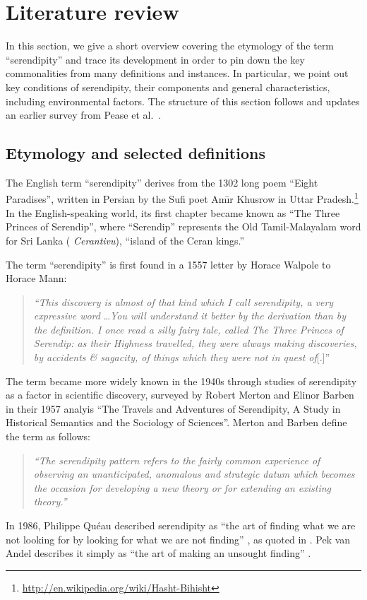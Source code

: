 \documentclass{llncs}
\begin{document}
\section{Literature review} \label{sec:literature-review}

In this section, we give a short overview covering the etymology of
the term ``serendipity'' and trace its development in order to pin
down the key commonalities from many definitions and instances.  In
particular, we point out key conditions of serendipity, their
components and general characteristics, including environmental
factors.  The structure of this section follows and updates an earlier
survey from Pease et al.~\cite{pease2013discussion}.

\subsection{Etymology and selected definitions} \label{sec:overview-serendipity}
The English term ``serendipity'' derives from the 1302 long poem ``Eight Paradises'', written in Persian by the Sufi poet Am\={\i}r Khusrow in Uttar Pradesh.\footnote{\url{http://en.wikipedia.org/wiki/Hasht-Bihisht}}  In the English-speaking world, its first chapter became known as ``The Three Princes of Serendip'', where ``Serendip'' represents the Old Tamil-Malayalam word for Sri Lanka (%
\emph{Cerantivu}), ``island of the Ceran kings.''

The term ``serendipity'' is first found in a 1557 letter by Horace Walpole to Horace Mann:
\begin{quote}
\emph{``This discovery is almost of that kind which I call serendipity, a very expressive
word} \ldots \emph{You will understand it better by the derivation than by the
definition. I once read a silly fairy tale, called The Three Princes of Serendip:
as their Highness travelled, they were always making discoveries, by accidents
\& sagacity, of things which they were not in quest of}[.]''~\cite[p. 633]{van1994anatomy}
\end{quote}
The term became more widely known in the 1940s through studies of serendipity as a factor in scientific discovery, surveyed by Robert Merton and Elinor Barben \cite{merton} in their 1957 analyis ``The Travels and Adventures of Serendipity, A Study in Historical Semantics and the Sociology of Sciences''.  Merton and Barben define the term as follows:
\begin{quote}
\emph{``The serendipity pattern refers to the fairly common experience of observing
an unanticipated, anomalous and strategic datum which becomes the occasion
for developing a new theory or for extending an existing theory.''} \cite[p. 635]{van1994anatomy}
\end{quote}
In 1986, Philippe Qu\'eau described serendipity as ``the art of
finding what we are not looking for by looking for what we are not
finding'' \cite{eloge-de-la-simulation}, as quoted in
\cite[p. 121]{Campos2002}.  Pek van Andel describes it simply as ``the
art of making an unsought finding'' \cite[p. 631]{van1994anatomy}.
\end{document}
